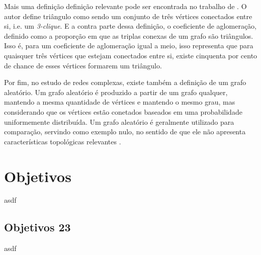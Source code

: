 \documentclass[notes.tex]{subfiles}
\begin{document}
Mais uma definição definição relevante pode ser encontrada no trabalho de .
O autor define triângulo como sendo um conjunto de três vértices conectados entre si, i.e. um \emph{3-clique}.
E a contra parte dessa definição, o coeficiente de aglomeração, definido como a proporção em que as triplas conexas de um grafo são triângulos.
Isso é, para um coeficiente de aglomeração igual a meio, isso representa que para quaisquer três vértices que estejam conectados entre si, existe cinquenta por cento de chance de esses vértices formarem um triângulo.

Por fim, no estudo de redes complexas, existe também a definição de um grafo aleatório.
Um grafo aleatório é produzido a partir de um grafo qualquer, mantendo a mesma quantidade de vértices e mantendo o mesmo grau, mas considerando que os vértices estão conetados baseados em uma probabilidade uniformemente distribuída.
Um grafo aleatório é geralmente utilizado para comparação, servindo como exemplo nulo, no sentido de que ele não apresenta características topológicas relevantes \cite{fortunato2010community}.

\section{Objetivos}

    asdf
\subsection{Objetivos 23}

    asdf
\end{document}

